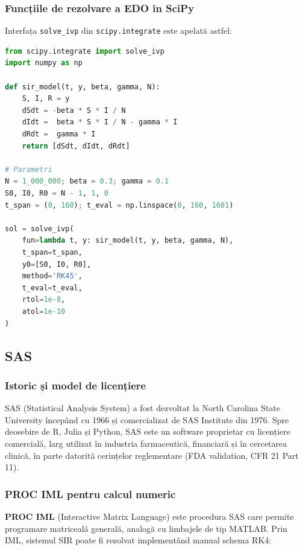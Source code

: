 \subsubsection{Funcțiile de rezolvare a EDO în SciPy}

Interfața \texttt{solve\_ivp} din \texttt{scipy.integrate} este apelată astfel:
\begin{lstlisting}[language=Python, caption={Interfața solve\_ivp din SciPy pentru rezolvarea sistemului SIR}]
from scipy.integrate import solve_ivp
import numpy as np

def sir_model(t, y, beta, gamma, N):
    S, I, R = y
    dSdt = -beta * S * I / N
    dIdt =  beta * S * I / N - gamma * I
    dRdt =  gamma * I
    return [dSdt, dIdt, dRdt]

# Parametri
N = 1_000_000; beta = 0.3; gamma = 0.1
S0, I0, R0 = N - 1, 1, 0
t_span = (0, 160); t_eval = np.linspace(0, 160, 1601)

sol = solve_ivp(
    fun=lambda t, y: sir_model(t, y, beta, gamma, N),
    t_span=t_span,
    y0=[S0, I0, R0],
    method='RK45',
    t_eval=t_eval,
    rtol=1e-8,
    atol=1e-10
)
\end{lstlisting}

\subsection{SAS}
\label{subsec:sas}

\subsubsection{Istoric și model de licențiere}

SAS (Statistical Analysis System) a fost dezvoltat la North Carolina State
University începând cu 1966 și comercializat de SAS Institute din 1976.
Spre deosebire de R, Julia și Python, SAS este un software proprietar cu
licențiere comercială, larg utilizat în industria farmaceutică, financiară
și în cercetarea clinică, în parte datorită cerințelor reglementare (FDA
validation, CFR 21 Part 11).

\subsubsection{PROC IML pentru calcul numeric}

\textbf{PROC IML} (Interactive Matrix Language) este procedura SAS care
permite programare matriceală generală, analogă cu limbajele de tip MATLAB.
Prin IML, sistemul SIR poate fi rezolvat implementând manual schema RK4:

